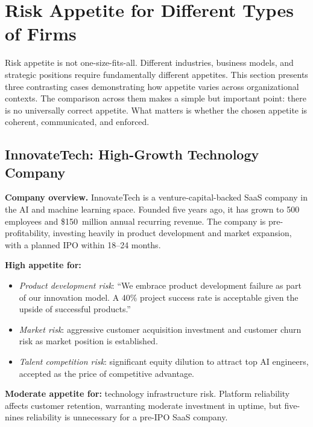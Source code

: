 \documentclass[11pt,openany]{book}
\providecommand{\tightlist}{\setlength{\itemsep}{0pt}\setlength{\parskip}{0pt}}
\begin{document}
\section{Risk Appetite for Different Types of Firms}
\label{sec:appetite-by-firm-type}

Risk appetite is not one-size-fits-all. Different industries, business models,
and strategic positions require fundamentally different appetites. This section
presents three contrasting cases demonstrating how appetite varies across
organizational contexts. The comparison across them makes a simple but important
point: there is no universally correct appetite. What matters is whether the
chosen appetite is coherent, communicated, and enforced.

\subsection{InnovateTech: High-Growth Technology Company}
\label{subsec:innovatetech}

\textbf{Company overview.} InnovateTech is a venture-capital-backed SaaS company
in the AI and machine learning space. Founded five years ago, it has grown to
500 employees and \$150~million annual recurring revenue. The company is pre-
profitability, investing heavily in product development and market expansion,
with a planned IPO within 18--24 months.

\textbf{High appetite for:}
\begin{itemize}\tightlist
  \item \emph{Product development risk}: ``We embrace product development failure
        as part of our innovation model. A 40\% project success rate is
        acceptable given the upside of successful products.''
  \item \emph{Market risk}: aggressive customer acquisition investment and
        customer churn risk as market position is established.
  \item \emph{Talent competition risk}: significant equity dilution to attract top
        AI engineers, accepted as the price of competitive advantage.
\end{itemize}

\textbf{Moderate appetite for:} technology infrastructure risk. Platform
reliability affects customer retention, warranting moderate investment in
uptime, but five-nines reliability is unnecessary for a pre-IPO SaaS company.
\end{document}
